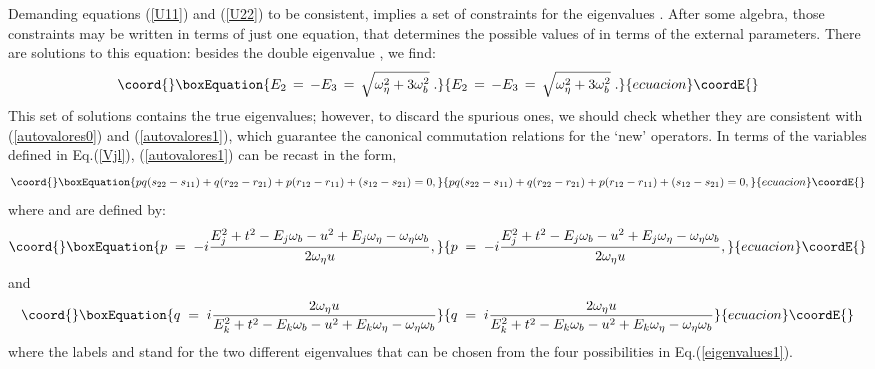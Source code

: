 \documentclass[a4paper,12pt]{article}
\providecommand{\n}{\eta}
\providecommand{\w}{\omega}
\begin{document}
Demanding equations (\ref{U11}) and (\ref{U22}) to be consistent,
implies a set of constraints for the eigenvalues \coordHE{}. After some
algebra, those constraints may be written in terms of just one
equation, that determines the possible values of \coordHE{} in terms of the external
parameters. There are \coordHE{} solutions to this equation: besides the
double eigenvalue \coordHE{}, we find:
  \begin{equation}\coord{}\boxEquation{
  E_2\,=\,-E_3\,=\,\sqrt{\w_\n^2+3\w_b^2}\;.
\label{eigenvalues1}
}{
  E_2\,=\,-E_3\,=\,\sqrt{\w_\n^2+3\w_b^2}\;.
}{ecuacion}\coordE{}\end{equation}
This set of solutions contains the true eigenvalues; however, to
discard the spurious ones, we should check whether they are
consistent with (\ref{autovalores0}) and (\ref{autovalores1}), which
guarantee the canonical commutation relations for the `new' operators.
In terms of the variables defined in Eq.(\ref{Vjl}),
(\ref{autovalores1}) can be recast in the form,
\begin{equation}\coord{}\boxEquation{\label{A=0}
pq(s_{22}-s_{11})+q(r_{22}-r_{21})+p(r_{12}-r_{11})+(s_{12}-s_{21})=0,
}{pq(s_{22}-s_{11})+q(r_{22}-r_{21})+p(r_{12}-r_{11})+(s_{12}-s_{21})=0,
}{ecuacion}\coordE{}\end{equation}
where \coordHE{} and \coordHE{} are defined by:
\begin{equation}\coord{}\boxEquation{\label{p}
p\;=\;-i\frac{E_j^2+t^2-E_j \w_b-u^2+E_j \w_\n-\w_\n \w_b}{2 \w_\n u},
}{p\;=\;-i\frac{E_j^2+t^2-E_j \w_b-u^2+E_j \w_\n-\w_\n \w_b}{2 \w_\n u},
}{ecuacion}\coordE{}\end{equation}
and
\begin{equation}\coord{}\boxEquation{\label{q}
q\;=\;i\frac{2 \w_\n u}{E_k^2+t^2-E_k \w_b-u^2+E_k \w_\n-\w_\n \w_b}
}{q\;=\;i\frac{2 \w_\n u}{E_k^2+t^2-E_k \w_b-u^2+E_k \w_\n-\w_\n \w_b}
}{ecuacion}\coordE{}\end{equation}
where the labels \coordHE{} and \coordHE{} stand for the two different eigenvalues
that can be chosen from the four possibilities in
Eq.(\ref{eigenvalues1}).
\end{document}
